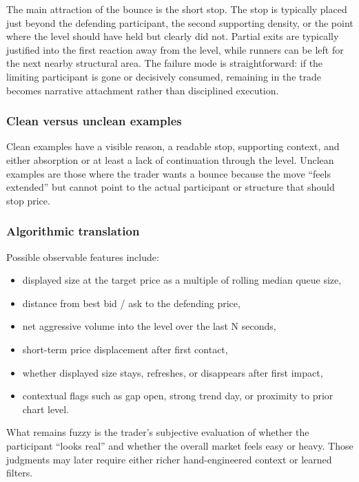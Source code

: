 The main attraction of the bounce is the short stop. The stop is typically placed just beyond
the defending participant, the second supporting density, or the point where the level should
have held but clearly did not. Partial exits are typically justified into the first reaction
away from the level, while runners can be left for the next nearby structural area. The
failure mode is straightforward: if the limiting participant is gone or decisively consumed,
remaining in the trade becomes narrative attachment rather than disciplined execution.

\subsubsection{Clean versus unclean examples}

Clean examples have a visible reason, a readable stop, supporting context, and either
absorption or at least a lack of continuation through the level. Unclean examples are those
where the trader wants a bounce because the move ``feels extended'' but cannot point to the
actual participant or structure that should stop price.

\subsubsection{Algorithmic translation}

Possible observable features include:

\begin{itemize}[leftmargin=1.4em]
  \item displayed size at the target price as a multiple of rolling median queue size,
  \item distance from best bid / ask to the defending price,
  \item net aggressive volume into the level over the last N seconds,
  \item short-term price displacement after first contact,
  \item whether displayed size stays, refreshes, or disappears after first impact,
  \item contextual flags such as gap open, strong trend day, or proximity to prior chart level.
\end{itemize}

What remains fuzzy is the trader's subjective evaluation of whether the participant ``looks
real'' and whether the overall market feels easy or heavy. Those judgments may later require
either richer hand-engineered context or learned filters.

